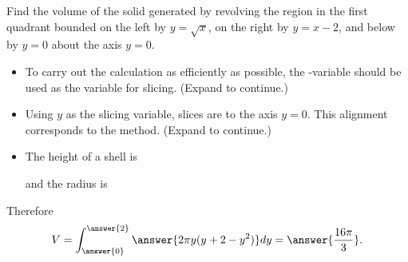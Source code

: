 \documentclass{ximera}
\begin{document}
\begin{example}
Find the volume of the solid generated by revolving the region in the first quadrant bounded on the left by $y = \sqrt{x}$,  on the right by $y = x-2$, and below by $y = 0$ about the axis $y = 0$.
\begin{itemize}
\item To carry out the calculation as efficiently as possible, the -variable should be used as the variable for slicing.
(Expand to continue.)
\end{itemize}
\begin{itemize}
\item Using $y$ as the slicing variable, slices are  to the axis $y=0$. This alignment corresponds to the  method.
(Expand to continue.)
\end{itemize}
\begin{expandable}
\begin{itemize}
\item The height of a shell is 
\begin{multipleChoice}
\end{multipleChoice}
and the radius is
\begin{multipleChoice}
\end{multipleChoice}
\end{itemize}
Therefore
\[ V = \int_{\answer{0}}^{\answer{2}} \answer{2 \pi y(y+2-y^2)} dy = \answer{\frac{16 \pi}{3}}. \]
\end{expandable}
\end{example}
\end{document}

